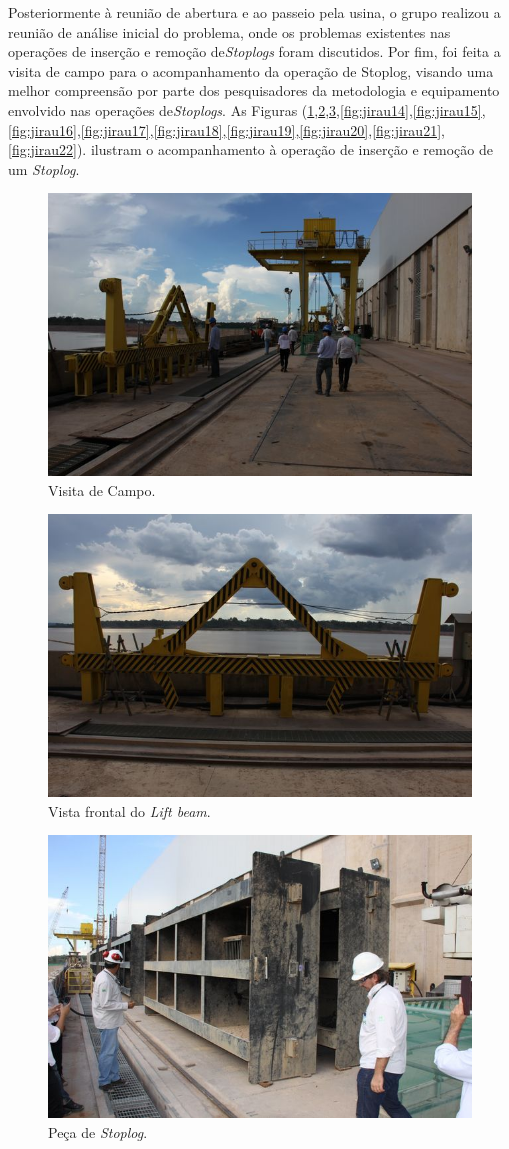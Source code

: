\clearpage

Posteriormente à reunião de abertura e ao passeio pela usina, 
o grupo realizou a reunião de análise inicial do problema, onde os problemas
existentes nas operações de inserção e remoção de\emph{Stoplogs} foram
discutidos.
Por fim, foi feita a visita de campo para o acompanhamento da operação de
Stoplog, visando uma melhor compreensão por parte dos pesquisadores da
metodologia e equipamento envolvido nas operações de\emph{Stoplogs}. As Figuras
(\ref{fig:jirau9},\ref{fig:jirau11},\ref{fig:jirau13},\ref{fig:jirau14},\ref{fig:jirau15},\ref{fig:jirau16},\ref{fig:jirau17},\ref{fig:jirau18},\ref{fig:jirau19},\ref{fig:jirau20},\ref{fig:jirau21},\ref{fig:jirau22}).
ilustram o acompanhamento à operação de inserção e remoção de um \emph{Stoplog}.

\begin{figure}[h!]
    \centering \includegraphics[width=0.6\columnwidth]{figs/jirau/jirau_09}
    \caption{Visita de Campo.}
    \label{fig:jirau9}
\end{figure}

\begin{figure}[h!]
    \centering \includegraphics[width=0.6\columnwidth]{figs/jirau/jirau_11}
    \caption{Vista frontal do \emph{Lift beam}.}
    \label{fig:jirau11}
\end{figure}

\begin{figure}[h!]
    \centering \includegraphics[width=0.6\columnwidth]{figs/jirau/jirau_13}
    \caption{Peça de \emph{Stoplog}.}
    \label{fig:jirau13}
\end{figure}

